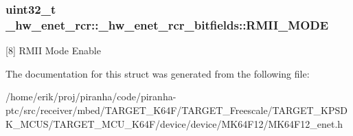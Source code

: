 \subsubsection[{\texorpdfstring{R\+M\+I\+I\+\_\+\+M\+O\+DE}{RMII_MODE}}]{\setlength{\rightskip}{0pt plus 5cm}uint32\+\_\+t \+\_\+hw\+\_\+enet\+\_\+rcr\+::\+\_\+hw\+\_\+enet\+\_\+rcr\+\_\+bitfields\+::\+R\+M\+I\+I\+\_\+\+M\+O\+DE}\hypertarget{struct__hw__enet__rcr_1_1__hw__enet__rcr__bitfields_ae75f27db57facb0a4d37869cd58c36eb}{}\label{struct__hw__enet__rcr_1_1__hw__enet__rcr__bitfields_ae75f27db57facb0a4d37869cd58c36eb}
\mbox{[}8\mbox{]} R\+M\+II Mode Enable 

The documentation for this struct was generated from the following file\+:\begin{DoxyCompactItemize}
\item 
/home/erik/proj/piranha/code/piranha-\/ptc/src/receiver/mbed/\+T\+A\+R\+G\+E\+T\+\_\+\+K64\+F/\+T\+A\+R\+G\+E\+T\+\_\+\+Freescale/\+T\+A\+R\+G\+E\+T\+\_\+\+K\+P\+S\+D\+K\+\_\+\+M\+C\+U\+S/\+T\+A\+R\+G\+E\+T\+\_\+\+M\+C\+U\+\_\+\+K64\+F/device/device/\+M\+K64\+F12/M\+K64\+F12\+\_\+enet.\+h\end{DoxyCompactItemize}
